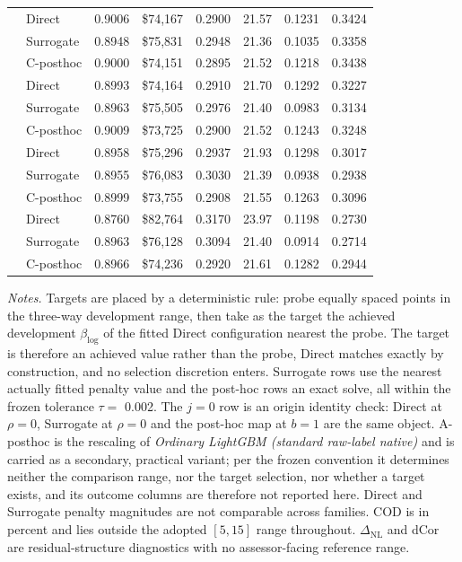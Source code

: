 \documentclass[10pt]{article}
\theoremstyle{definition}
\newcommand{\1}{\mathbf{1}}
\begin{document}
{\begin{table}[!htbp]
{\begin{tabular}{@{}llrrrrrr@{}}
\addlinespace[2pt]
2 & Direct & 0.9006 & \$74,167 & 0.2900 & 21.57 & 0.1231 & 0.3424 \\
 & Surrogate & 0.8948 & \$75,831 & 0.2948 & 21.36 & 0.1035 & 0.3358 \\
 & C-posthoc & 0.9000 & \$74,151 & 0.2895 & 21.52 & 0.1218 & 0.3438 \\
\addlinespace[2pt]
3 & Direct & 0.8993 & \$74,164 & 0.2910 & 21.70 & 0.1292 & 0.3227 \\
 & Surrogate & 0.8963 & \$75,505 & 0.2976 & 21.40 & 0.0983 & 0.3134 \\
 & C-posthoc & 0.9009 & \$73,725 & 0.2900 & 21.52 & 0.1243 & 0.3248 \\
\addlinespace[2pt]
4 & Direct & 0.8958 & \$75,296 & 0.2937 & 21.93 & 0.1298 & 0.3017 \\
 & Surrogate & 0.8955 & \$76,083 & 0.3030 & 21.39 & 0.0938 & 0.2938 \\
 & C-posthoc & 0.8999 & \$73,755 & 0.2908 & 21.55 & 0.1263 & 0.3096 \\
\addlinespace[2pt]
5 & Direct & 0.8760 & \$82,764 & 0.3170 & 23.97 & 0.1198 & 0.2730 \\
 & Surrogate & 0.8963 & \$76,128 & 0.3094 & 21.40 & 0.0914 & 0.2714 \\
 & C-posthoc & 0.8966 & \$74,236 & 0.2920 & 21.61 & 0.1282 & 0.2944 \\
\bottomrule
\end{tabular}}
\vspace{1mm}
\begin{minipage}{\textwidth}
\scriptsize
\emph{Notes.}
Targets are placed by a deterministic rule: probe equally spaced points in the
three-way development range, then take as the target the achieved development $\beta_{\log}$ of the
fitted Direct configuration nearest the probe. The target is therefore an achieved value rather than
the probe, Direct matches exactly by construction, and no selection discretion enters. Surrogate
rows use the nearest actually fitted penalty value and the post-hoc rows an exact solve, all within
the frozen tolerance $\tau=$ 0.002. The $j=0$ row is an origin identity check: Direct at
$\rho=0$, Surrogate at $\rho=0$ and the post-hoc map at $b=1$ are the same object. A-posthoc is the
rescaling of \emph{Ordinary LightGBM (standard raw-label native)} and is carried as a secondary,
practical variant; per the frozen convention it determines neither the comparison range, nor the
target selection, nor whether a target exists, and its outcome columns are therefore not reported
here. Direct and Surrogate penalty magnitudes are not comparable across families. COD is in percent
and lies outside the adopted $[5,15]$ range throughout. $\Delta_{\mathrm{NL}}$ and dCor are
residual-structure diagnostics with no assessor-facing reference range.
\end{minipage}
\end{table}
}
\end{document}
